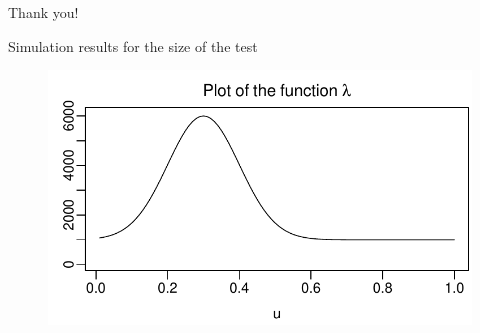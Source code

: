 \documentclass[10pt, handout]{beamer}
\begin{document}
\begin{frame}[standout]
  Thank you!
\end{frame}


\appendix

\begin{frame}{Simulation results for the size of the test}
\begin{figure}[t!]
	\includegraphics[height = 0.4\textheight]{plots/lambda_fct}
\end{figure}
\vspace{-2mm}
\scriptsize{\begin{table}[t]
\begin{center}
\caption{Size of the multiscale test}
\label{tab:size_shape}

\end{center}
\end{table}}
\end{frame}
\end{document}
